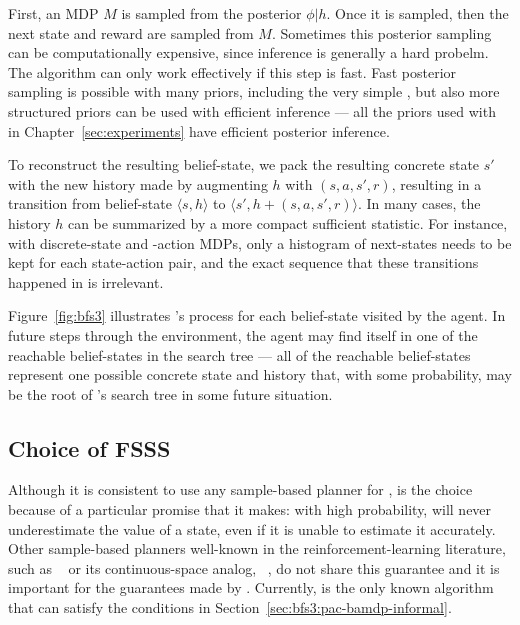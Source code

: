 First, an MDP $M$ is sampled from the posterior $\phi|h$. Once it is sampled, then the next state and reward are sampled from $M$. Sometimes this posterior sampling can be computationally expensive, since inference is generally a hard probelm. The  algorithm can only work effectively if this step is fast. Fast posterior sampling is possible with many priors, including the very simple , but also more structured priors can be used with efficient inference --- all the priors used with  in Chapter~\ref{sec:experiments} have efficient posterior inference.

To reconstruct the resulting belief-state, we pack the resulting concrete state $s'$ with the new history made by augmenting $h$ with $(s, a, s', r)$, resulting in a transition from belief-state $\langle s, h\rangle$ to $\langle s', h + (s,a,s',r)\rangle$.  In many cases, the history $h$ can be summarized by a more compact sufficient statistic. For instance, with discrete-state and -action MDPs, only a histogram of next-states needs to be kept for each state-action pair, and the exact sequence that these transitions happened in is irrelevant.

Figure~\ref{fig:bfs3} illustrates 's process for each belief-state visited by the agent. In future steps through the environment, the agent may find itself in one of the reachable belief-states in the search tree --- all of the reachable belief-states represent one possible concrete state and history that, with some probability, may be the root of 's search tree in some future situation. 

\subsection{Choice of FSSS}

Although it is consistent to use any sample-based planner for ,  is the choice because of a particular promise that it makes: with high probability,  will never underestimate the value of a state, even if it is unable to estimate it accurately. Other sample-based planners well-known in the reinforcement-learning literature, such as ~\cite{kocsis06} or its continuous-space analog, ~\cite{mansley2011sample}, do not share this guarantee and it is important for the guarantees made by . Currently,  is the only known algorithm that can satisfy the conditions in Section~\ref{sec:bfs3:pac-bamdp-informal}.

